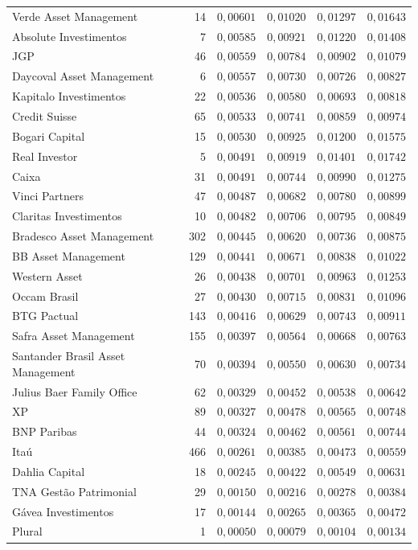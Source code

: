 \documentclass[12pt,a4paper]{article}
\begin{document}
\begin{center}
\begin{longtable}{@{}lrrrrr@{}}
Verde Asset Management & 14 & $0{,}00601$ & $0{,}01020$ & $0{,}01297$ & $0{,}01643$ \\
Absolute Investimentos & 7 & $0{,}00585$ & $0{,}00921$ & $0{,}01220$ & $0{,}01408$ \\
JGP & 46 & $0{,}00559$ & $0{,}00784$ & $0{,}00902$ & $0{,}01079$ \\
Daycoval Asset Management & 6 & $0{,}00557$ & $0{,}00730$ & $0{,}00726$ & $0{,}00827$ \\
Kapitalo Investimentos & 22 & $0{,}00536$ & $0{,}00580$ & $0{,}00693$ & $0{,}00818$ \\
Credit Suisse & 65 & $0{,}00533$ & $0{,}00741$ & $0{,}00859$ & $0{,}00974$ \\
Bogari Capital & 15 & $0{,}00530$ & $0{,}00925$ & $0{,}01200$ & $0{,}01575$ \\
Real Investor & 5 & $0{,}00491$ & $0{,}00919$ & $0{,}01401$ & $0{,}01742$ \\
Caixa & 31 & $0{,}00491$ & $0{,}00744$ & $0{,}00990$ & $0{,}01275$ \\
Vinci Partners & 47 & $0{,}00487$ & $0{,}00682$ & $0{,}00780$ & $0{,}00899$ \\
Claritas Investimentos & 10 & $0{,}00482$ & $0{,}00706$ & $0{,}00795$ & $0{,}00849$ \\
Bradesco Asset Management & 302 & $0{,}00445$ & $0{,}00620$ & $0{,}00736$ & $0{,}00875$ \\
BB Asset Management & 129 & $0{,}00441$ & $0{,}00671$ & $0{,}00838$ & $0{,}01022$ \\
Western Asset & 26 & $0{,}00438$ & $0{,}00701$ & $0{,}00963$ & $0{,}01253$ \\
Occam Brasil & 27 & $0{,}00430$ & $0{,}00715$ & $0{,}00831$ & $0{,}01096$ \\
BTG Pactual & 143 & $0{,}00416$ & $0{,}00629$ & $0{,}00743$ & $0{,}00911$ \\
Safra Asset Management & 155 & $0{,}00397$ & $0{,}00564$ & $0{,}00668$ & $0{,}00763$ \\
Santander Brasil Asset Management & 70 & $0{,}00394$ & $0{,}00550$ & $0{,}00630$ & $0{,}00734$ \\
Julius Baer Family Office & 62 & $0{,}00329$ & $0{,}00452$ & $0{,}00538$ & $0{,}00642$ \\
XP & 89 & $0{,}00327$ & $0{,}00478$ & $0{,}00565$ & $0{,}00748$ \\
BNP Paribas & 44 & $0{,}00324$ & $0{,}00462$ & $0{,}00561$ & $0{,}00744$ \\
Itaú & 466 & $0{,}00261$ & $0{,}00385$ & $0{,}00473$ & $0{,}00559$ \\
Dahlia Capital & 18 & $0{,}00245$ & $0{,}00422$ & $0{,}00549$ & $0{,}00631$ \\
TNA Gestão Patrimonial & 29 & $0{,}00150$ & $0{,}00216$ & $0{,}00278$ & $0{,}00384$ \\
Gávea Investimentos & 17 & $0{,}00144$ & $0{,}00265$ & $0{,}00365$ & $0{,}00472$ \\
Plural & 1 & $0{,}00050$ & $0{,}00079$ & $0{,}00104$ & $0{,}00134$ \\
\end{longtable}
\end{center}
\end{document}
